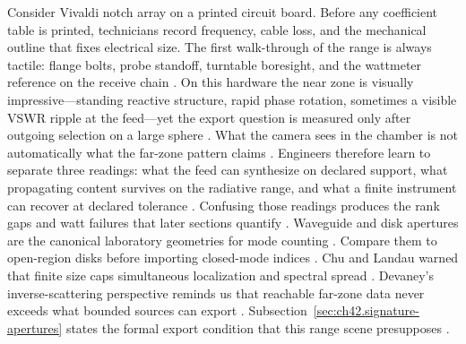 \begin{physicalvignette}
Consider Vivaldi notch array on a printed circuit board. Before any coefficient table is printed, technicians record frequency, cable loss, and the mechanical outline that fixes electrical size. The first walk-through of the range is always tactile: flange bolts, probe standoff, turntable boresight, and the wattmeter reference on the receive chain \cite{hansen1988}.
On this hardware the near zone is visually impressive---standing reactive structure, rapid phase rotation, sometimes a visible VSWR ripple at the feed---yet the export question is measured only after outgoing selection on a large sphere \cite{harrington2001}. What the camera sees in the chamber is not automatically what the far-zone pattern claims \cite{stratton1941}.
Engineers therefore learn to separate three readings: what the feed can synthesize on declared support, what propagating content survives on the radiative range, and what a finite instrument can recover at declared tolerance \cite{devaney2004}. Confusing those readings produces the rank gaps and watt failures that later sections quantify \cite{pal2026}.
Waveguide and disk apertures are the canonical laboratory geometries for mode counting . Compare them to open-region disks before importing closed-mode indices .
Chu and Landau warned that finite size caps simultaneous localization and spectral spread \cite{chu1948}. Devaney's inverse-scattering perspective reminds us that reachable far-zone data never exceeds what bounded sources can export \cite{devaney2004}.
Subsection~\ref{sec:ch42.signature-apertures} states the formal export condition that this range scene presupposes \cite{stratton1941}.
\end{physicalvignette}
